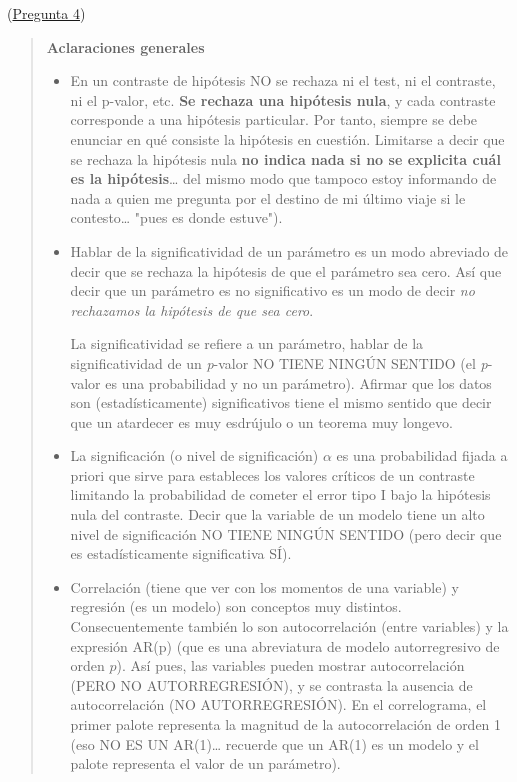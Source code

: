 \documentclass[10pt]{article}
\begin{document}
(\hyperref[sec:org1464cae]{Pregunta 4})


\begin{quote}
\textbf{Aclaraciones generales}

\begin{itemize}
\item En un contraste de hipótesis NO se rechaza ni el test, ni el
contraste, ni el p-valor, etc. \textbf{Se rechaza una hipótesis nula}, y
cada contraste corresponde a una hipótesis particular. Por tanto,
siempre se debe enunciar en qué consiste la hipótesis en cuestión.
Limitarse a decir que se rechaza la hipótesis nula \textbf{no indica nada
si no se explicita cuál es la hipótesis}\ldots{} del mismo modo que
tampoco estoy informando de nada a quien me pregunta por el destino
de mi último viaje si le contesto\ldots{} "pues es donde estuve").
\end{itemize}


\begin{itemize}
\item Hablar de la significatividad de un parámetro es un modo abreviado
de decir que se rechaza la hipótesis de que el parámetro sea
cero. Así que decir que un parámetro es no significativo es un modo
de decir \emph{no rechazamos la hipótesis de que sea cero}.

La significatividad se refiere a un parámetro, hablar de la
significatividad de un \emph{p}-valor NO TIENE NINGÚN SENTIDO (el
\emph{p}-valor es una probabilidad y no un parámetro). Afirmar que los
datos son (estadísticamente) significativos tiene el mismo sentido
que decir que un atardecer es muy esdrújulo o un teorema muy
longevo.
\end{itemize}


\begin{itemize}
\item La significación (o nivel de significación) \(\alpha\) es una
probabilidad fijada a priori que sirve para estableces los valores
críticos de un contraste limitando la probabilidad de cometer el
error tipo I bajo la hipótesis nula del contraste. Decir que la
variable de un modelo tiene un alto nivel de significación NO TIENE
NINGÚN SENTIDO (pero decir que es estadísticamente significativa
SÍ).
\end{itemize}


\begin{itemize}
\item Correlación (tiene que ver con los momentos de una variable) y
regresión (es un modelo) son conceptos muy
distintos. Consecuentemente también lo son autocorrelación (entre
variables) y la expresión AR(p) (que es una abreviatura de modelo
autorregresivo de orden \(p\)). Así pues, las variables pueden mostrar
autocorrelación (PERO NO AUTORREGRESIÓN), y se contrasta la ausencia
de autocorrelación (NO AUTORREGRESIÓN). En el correlograma, el
primer palote representa la magnitud de la autocorrelación de orden
1 (eso NO ES UN AR(1)\ldots{} recuerde que un AR(1) es un modelo y el
palote representa el valor de un parámetro).
\end{itemize}



\end{quote}
\end{document}
